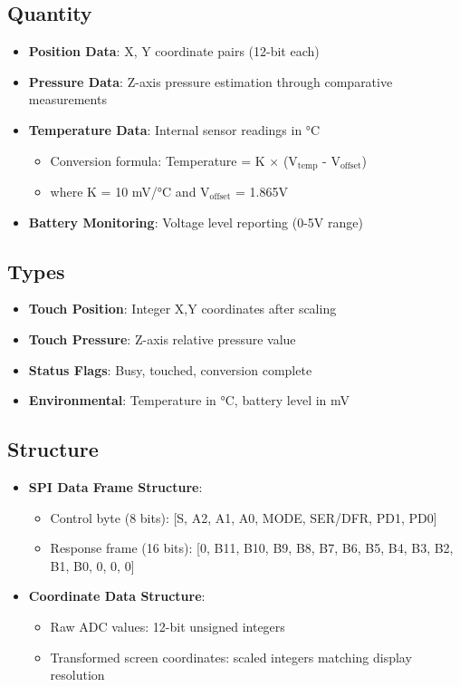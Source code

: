 \subsection{Quantity}

\begin{itemize}
	\item \textbf{Position Data}: X, Y coordinate pairs (12-bit each)
	\item \textbf{Pressure Data}: Z-axis pressure estimation through comparative measurements
	\item \textbf{Temperature Data}: Internal sensor readings in °C
	\begin{itemize}
		\item Conversion formula: Temperature = K × (V$_{\text{temp}}$ - V$_{\text{offset}}$)
		\item where K = 10 mV/°C and V$_{\text{offset}}$ = 1.865V \cite{xpt2046:2007}
	\end{itemize}
	\item \textbf{Battery Monitoring}: Voltage level reporting (0-5V range)
\end{itemize}

\subsection{Types}

\begin{itemize}
	\item \textbf{Touch Position}: Integer X,Y coordinates after scaling
	\item \textbf{Touch Pressure}: Z-axis relative pressure value
	\item \textbf{Status Flags}: Busy, touched, conversion complete
	\item \textbf{Environmental}: Temperature in °C, battery level in mV
\end{itemize}

\subsection{Structure}

\begin{itemize}
	\item \textbf{SPI Data Frame Structure}:
	\begin{itemize}
		\item Control byte (8 bits): [S, A2, A1, A0, MODE, SER/DFR, PD1, PD0]
		\item Response frame (16 bits): [0, B11, B10, B9, B8, B7, B6, B5, B4, B3, B2, B1, B0, 0, 0, 0]
	\end{itemize}
	\item \textbf{Coordinate Data Structure}:
	\begin{itemize}
		\item Raw ADC values: 12-bit unsigned integers
		\item Transformed screen coordinates: scaled integers matching display resolution
	\end{itemize}
\end{itemize}

